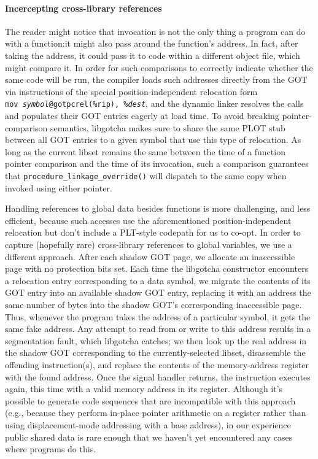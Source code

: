 \paragraph{Incercepting cross-library references}

The reader might notice that invocation is not the only thing a program can do with a
function:\@ it might also pass around the function's address.  In fact, after taking
the address, it could pass it to code within a different object file, which might
compare it.  In order for such comparisons to correctly indicate whether the same
code will be run, the compiler loads such addresses directly from the GOT via
instructions of the special position-independent relocation form
\texttt{mov~\textit{symbol}@gotpcrel(\%rip),~\%\textit{dest}}, and the dynamic linker
resolves the calls and populates their GOT entries eagerly at load time.  To avoid
breaking pointer-comparison semantics, libgotcha makes sure to share the same PLOT
stub between all GOT entries to a given symbol that use this type of
relocation.  As long as the current libset remains the same between the time of a
function pointer comparison and the time of its invocation, such a comparison
guarantees that \texttt{procedure\_linkage\_override()} will dispatch to the same
copy when invoked using either pointer.

Handling references to global data besides functions is more challenging, and less
efficient, because such accesses use the aforementioned position-independent
relocation but don't include a PLT-style codepath for us to co-opt.
In order to capture (hopefully rare) cross-library references to global variables,
we use a different approach.  After each shadow GOT page, we allocate an inaccessible
page with no protection bits set.  Each time the libgotcha constructor encounters a
relocation entry corresponding to a data symbol, we migrate the contents of its GOT
entry into an available shadow GOT entry, replacing it with an address the same
number of bytes into the shadow GOT's corresponding inaccessible page.  Thus,
whenever the program takes the address of a particular symbol, it gets the same fake
address.  Any attempt to read from or write to this address results in a segmentation
fault, which libgotcha catches; we then look up the real address in the shadow GOT
corresponding to the currently-selected libset, disassemble the offending
instruction(s), and replace the contents of the memory-address register with the
found address.  Once the signal handler returns, the instruction executes again, this
time with a valid memory address in its register.  Although it's possible to generate
code sequences that are incompatible with this approach (e.g., because they perform
in-place pointer arithmetic on a register rather than using displacement-mode
addressing with a base address), in our experience public shared data is rare enough
that we haven't yet encountered any cases where programs do this.

